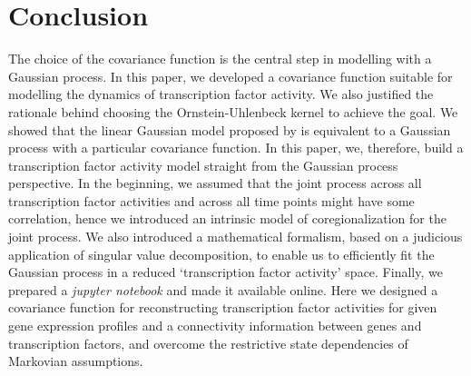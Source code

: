 \section{Conclusion}
 The choice of the covariance function is the central step in modelling with a Gaussian process. In this paper, we developed a covariance function suitable for modelling the dynamics of transcription factor activity. We also justified the rationale behind choosing the Ornstein-Uhlenbeck kernel to achieve the goal.  We showed that the linear Gaussian model proposed by \cite{Sanguinetti:2006} is equivalent to a Gaussian process with a particular covariance function. In this paper, we, therefore, build a transcription factor activity model straight from the Gaussian process perspective. In the beginning, we assumed that the joint process across all transcription factor activities and across all time points might have some correlation, hence we introduced an intrinsic model of coregionalization for the joint process. We also introduced a mathematical formalism, based on a judicious application of singular value decomposition, to enable us to efficiently fit the Gaussian process in a reduced \lq transcription factor activity\rq{ }space. Finally, we prepared a \emph{jupyter notebook} and made it available online. Here we designed a covariance function for reconstructing transcription factor activities for given gene expression profiles and a connectivity information between genes and transcription factors,  and overcome the restrictive state dependencies of Markovian assumptions.







